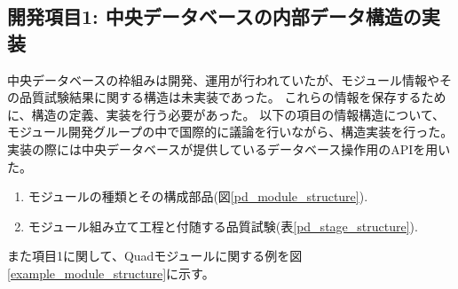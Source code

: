 \subsection{開発項目1: 中央データベースの内部データ構造の実装} \label{sec:implement_pd_schema}

中央データベースの枠組みは開発、運用が行われていたが、モジュール情報やその品質試験結果に関する構造は未実装であった。
これらの情報を保存するために、構造の定義、実装を行う必要があった。
以下の項目の情報構造について、モジュール開発グループの中で国際的に議論を行いながら、構造実装を行った。
実装の際には中央データベースが提供しているデータベース操作用のAPIを用いた。
\begin{enumerate}
  \item モジュールの種類とその構成部品(図\ref{pd_module_structure}).
  \item モジュール組み立て工程と付随する品質試験(表\ref{pd_stage_structure}).
\end{enumerate}

また項目1に関して、Quadモジュールに関する例を図\ref{example_module_structure}に示す。

